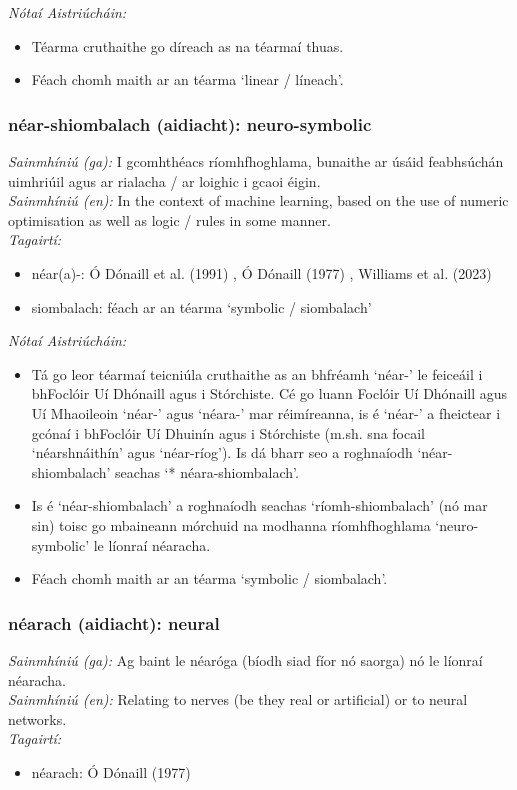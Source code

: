 \documentclass{article}
\begin{document}
 \noindent \textit{Nótaí Aistriúcháin:}
\begin{itemize}
	\item Téarma cruthaithe go díreach as na téarmaí thuas.
	\item Féach chomh maith ar an téarma `linear / líneach'.
\end{itemize}


\subsubsection*{néar-shiombalach (aidiacht): neuro-symbolic}
 \noindent \textit{Sainmhíniú (ga):} I gcomhthéacs ríomhfhoghlama, bunaithe ar úsáid feabhsúchán uimhriúil agus ar rialacha / ar loighic i gcaoi éigin.
\\
 \noindent \textit{Sainmhíniú (en):} In the context of machine learning, based on the use of numeric optimisation as well as logic / rules in some manner.
\\
 \noindent \textit{Tagairtí:}
\begin{itemize}
	\item néar(a)-: Ó Dónaill et al. (1991) \cite{focloir-beag}, Ó Dónaill (1977) \cite{odonaill}, Williams et al. (2023) \cite{storchiste}
	\item siombalach: féach ar an téarma `symbolic / siombalach'
\end{itemize}

 \noindent \textit{Nótaí Aistriúcháin:}
\begin{itemize}
	\item Tá go leor téarmaí teicniúla cruthaithe as an bhfréamh `néar-' le feiceáil i bhFoclóir Uí Dhónaill agus i Stórchiste. Cé go luann Foclóir Uí Dhónaill agus Uí Mhaoileoin `néar-' agus `néara-' mar réimíreanna, is é `néar-' a fheictear i gcónaí i bhFoclóir Uí Dhuinín agus i Stórchiste (m.sh. sna focail `néarshnáithín' agus `néar-ríog'). Is dá bharr seo a roghnaíodh `néar-shiombalach' seachas `* néara-shiombalach'.
	\item Is é `néar-shiombalach' a roghnaíodh seachas `ríomh-shiombalach' (nó mar sin) toisc go mbaineann mórchuid na modhanna ríomhfhoghlama `neuro-symbolic' le líonraí néaracha.
	\item Féach chomh maith ar an téarma `symbolic / siombalach'.
\end{itemize}


\subsubsection*{néarach (aidiacht): neural}
 \noindent \textit{Sainmhíniú (ga):} Ag baint le néaróga (bíodh siad fíor nó saorga) nó le líonraí néaracha.
\\
 \noindent \textit{Sainmhíniú (en):} Relating to nerves (be they real or artificial) or to neural networks.
\\
 \noindent \textit{Tagairtí:}
\begin{itemize}
	\item néarach: Ó Dónaill (1977) \cite{odonaill}
\end{itemize}
\end{document}
